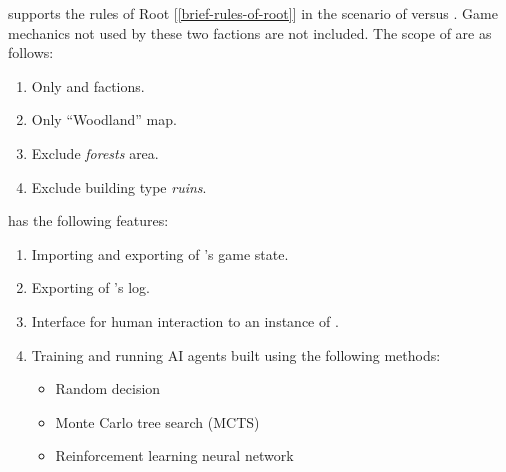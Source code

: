 \RootOurs{} supports the rules of Root [\ref{brief-rules-of-root}] in the scenario of \Marquise{} versus \Eyrie{}. Game mechanics not used by these two factions are not included. The scope of \RootOurs{} are as follows:
\begin{enumerate}
    \item Only \Marquise{} and \Eyrie{} factions.
    \item Only ``Woodland'' map.
    \item Exclude \textit{forests} area.
    \item Exclude building type \textit{ruins}.
\end{enumerate}

\RootAI{} has the following features:
\begin{enumerate}
    \item Importing and exporting of \RootOurs{}'s game state.
    \item Exporting of \RootOurs{}'s log.
    \item Interface for human interaction to an instance of \RootOurs{}.
    \item Training and running AI agents built using the following methods:
    \begin{itemize}
        \item Random decision
        \item Monte Carlo tree search (MCTS)
        \item Reinforcement learning neural network
    \end{itemize}
\end{enumerate}




